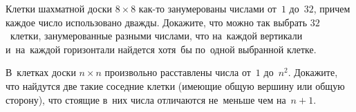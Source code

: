 \begin{problems}
\item
Клетки шахматной доски $8 \times 8$ как-то занумерованы числами от~$1$ до~$32$,
причем каждое число использовано дважды.
Докажите, что можно так выбрать $32$~клетки, занумерованные разными числами,
что на~каждой вертикали и~на~каждой горизонтали найдется хотя~бы по~одной
выбранной клетке.


\item
В~клетках доски $n \times n$ произвольно расставлены числа от~$1$ до~$n^2$.
Докажите, что найдутся две такие соседние клетки (имеющие общую вершину или
общую сторону), что стоящие в~них числа отличаются не~меньше чем на~$n + 1$.


\end{problems}


